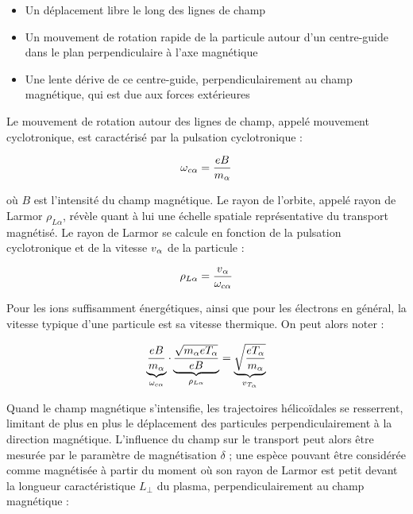 \begin{refsection}
\begin{itemize}
  \item Un déplacement libre le long des lignes de champ
  \item Un mouvement de rotation rapide de la particule
  autour d'un centre-guide dans le plan perpendiculaire à l'axe magnétique
  \item Une lente dérive de ce centre-guide, perpendiculairement au champ
  magnétique, qui est due aux forces extérieures
\end{itemize}

Le mouvement de rotation autour des lignes de champ, appelé mouvement
cyclotronique, est caractérisé par la pulsation cyclotronique : 

\begin{equation}
\omega{_{{c\alpha}}}=\frac{e B}{m_\alpha}
\end{equation}

où $B$ est l'intensité du champ magnétique. Le rayon de l'orbite, appelé rayon
de Larmor $\rho_{L\alpha}$, révèle quant à lui une échelle spatiale représentative du transport magnétisé.
Le rayon de Larmor se calcule en fonction de la pulsation cyclotronique et de la vitesse
$v{_{\alpha}}$ de la particule :

\begin{equation}
\rho_{L \alpha}
=\frac{v{_{\alpha}}}{\omega_{c{\alpha}}}
\end{equation}

Pour les ions suffisamment énergétiques, ainsi que pour les électrons en général,
la vitesse typique d'une particule est sa vitesse thermique. On peut alors noter
:

\begin{equation}
\underbrace{\frac{e B}{m_\alpha}}_{\omega_{c\alpha}}
\cdot\underbrace{\frac{\sqrt{m_\alpha eT_\alpha}}{eB}}_{\rho_{L\alpha}}
=\underbrace{\sqrt{\frac{eT_{\alpha}}{m_{\alpha}}}}_{v{_{T_{\alpha}}}}
\end{equation}

Quand le champ magnétique s'intensifie, les trajectoires
hélicoïdales se resserrent, limitant de plus en plus le déplacement des
particules perpendiculairement à la direction magnétique. L'influence du champ
sur le transport peut alors être mesurée par le paramètre de
magnétisation $\delta$ ; une espèce pouvant être considérée comme magnétisée à
partir du moment où son rayon de
Larmor est petit devant la longueur caractéristique $L_\perp$ du plasma,
perpendiculairement au champ magnétique :


\end{refsection}

